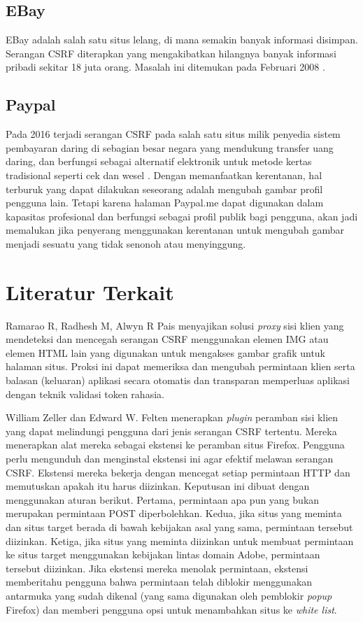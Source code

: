 \documentclass{article}
\begin{document}
\subsection{EBay}  
EBay adalah salah satu situs lelang, di mana semakin banyak informasi disimpan. Serangan CSRF diterapkan yang mengakibatkan hilangnya banyak informasi pribadi sekitar 18 juta orang. Masalah ini ditemukan pada Februari 2008 \cite{alexenko2010cross}.

\subsection{Paypal} 
Pada 2016 terjadi serangan CSRF pada salah satu situs milik penyedia sistem pembayaran daring di sebagian besar negara yang mendukung transfer uang daring, dan berfungsi sebagai alternatif elektronik untuk metode kertas tradisional seperti cek dan wesel \cite{paypal_brook}. Dengan memanfaatkan kerentanan, hal terburuk yang dapat dilakukan seseorang adalah mengubah gambar profil pengguna lain. Tetapi karena halaman Paypal.me dapat digunakan dalam kapasitas profesional dan berfungsi sebagai profil publik bagi pengguna, akan jadi memalukan jika penyerang menggunakan kerentanan untuk mengubah gambar menjadi sesuatu yang tidak senonoh atau menyinggung.


\section{Literatur Terkait}
Ramarao R, Radhesh M, Alwyn R Pais \cite{ramarao2013preventing} menyajikan solusi \textit{proxy} sisi klien yang mendeteksi dan mencegah serangan CSRF menggunakan elemen IMG atau elemen HTML lain yang digunakan untuk mengakses gambar grafik untuk halaman situs. Proksi ini dapat memeriksa dan mengubah permintaan klien serta balasan (keluaran) aplikasi secara otomatis dan transparan memperluas aplikasi dengan teknik validasi token rahasia.

William Zeller dan Edward W. Felten \cite{zeller2008cross} menerapkan \textit{plugin} peramban sisi klien yang dapat melindungi pengguna dari jenis serangan CSRF tertentu. Mereka menerapkan alat mereka sebagai ekstensi ke peramban situs Firefox. Pengguna perlu mengunduh dan menginstal ekstensi ini agar efektif melawan serangan CSRF. Ekstensi mereka bekerja dengan mencegat setiap permintaan HTTP dan memutuskan apakah itu harus diizinkan. Keputusan ini dibuat dengan menggunakan aturan berikut. Pertama, permintaan apa pun yang bukan merupakan permintaan POST diperbolehkan. Kedua, jika situs yang meminta dan situs target berada di bawah kebijakan asal yang sama, permintaan tersebut diizinkan. Ketiga, jika situs yang meminta diizinkan untuk membuat permintaan ke situs target menggunakan kebijakan lintas domain Adobe, permintaan tersebut diizinkan. Jika ekstensi mereka menolak permintaan, ekstensi memberitahu pengguna bahwa permintaan telah diblokir menggunakan antarmuka yang sudah dikenal (yang sama digunakan oleh pemblokir \textit{popup} Firefox) dan memberi pengguna opsi untuk menambahkan situs ke \textit{white list}.
\end{document}
